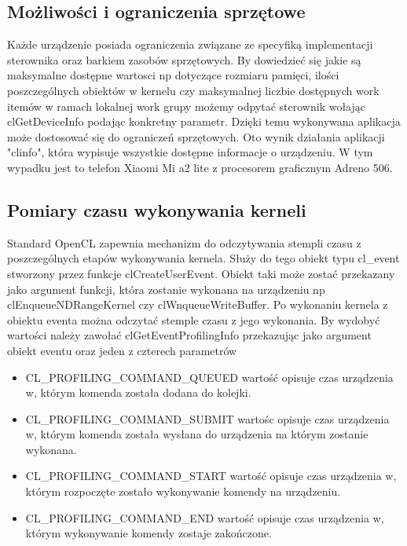 \subsection{Możliwości i ograniczenia sprzętowe}
Każde urządzenie posiada ograniczenia związane ze specyfiką implementacji sterownika oraz barkiem zasobów sprzętowych. By dowiedzieć się jakie są maksymalne dostępne wartosci np dotyczące rozmiaru pamięci, ilości poszczególnych obiektów w kernelu czy maksymalnej liczbie dostępnych work itemów w ramach lokalnej work grupy możemy odpytać sterownik wołając clGetDeviceInfo podając konkretny parametr. Dzięki temu wykonywana aplikacja może dostosować się do ograniczeń sprzętowych. Oto wynik działania aplikacji "clinfo", która wypisuje wszystkie dostępne informacje o urządzeniu. W tym wypadku jest to telefon Xiaomi Mi a2 lite z procesorem graficznym Adreno 506.
 
 \subsection{Pomiary czasu wykonywania kerneli}
 Standard OpenCL zapewnia mechanizm do odczytywania stempli czasu z poszczególnych etapów wykonywania kernela. Służy do tego obiekt typu cl\_event stworzony przez funkcje clCreateUserEvent. Obiekt taki może zostać przekazany jako argument funkcji, która zostanie wykonana na urządzeniu np clEnqueueNDRangeKernel czy clWnqueueWriteBuffer.
 Po wykonaniu kernela z obiektu eventa można odczytać stemple czasu z jego wykonania. By wydobyć wartości należy zawołać clGetEventProfilingInfo przekazując jako argument obiekt eventu oraz jeden z czterech parametrów 
 \begin{itemize}
     \item CL\_PROFILING\_COMMAND\_QUEUED wartość opisuje czas urządzenia w, którym komenda została dodana do kolejki.
     \item CL\_PROFILING\_COMMAND\_SUBMIT wartośc opisuje czas urządzenia w, którym komenda została wysłana do urządzenia na którym zostanie wykonana.
     \item CL\_PROFILING\_COMMAND\_START wartość opisuje czas urządzenia w, którym rozpoczęte zostało wykonywanie komendy na urządzeniu.
     \item CL\_PROFILING\_COMMAND\_END wartość opisuje czas urządzenia w, którym wykonywanie komendy zostaje zakończone.
\end{itemize}
